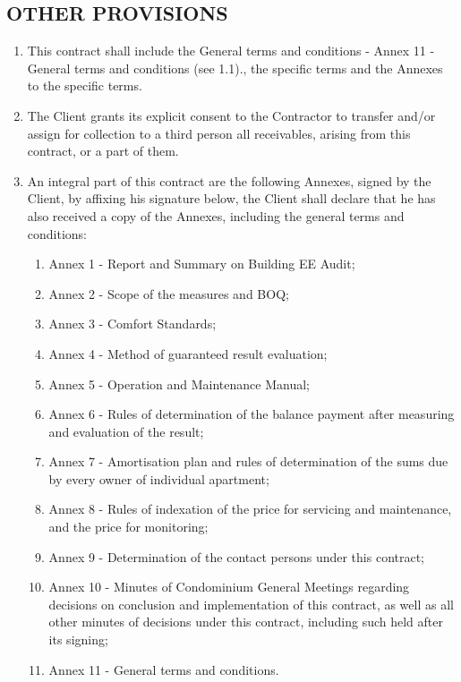 \subsection{OTHER PROVISIONS}
\begin{enumerate}
\item This contract shall include the General terms and conditions {-}
  Annex 11 {-} General terms and conditions (see 1.1)., the specific
  terms and the Annexes to the specific terms.
\item The Client grants its explicit consent to the Contractor to
  transfer and/or assign for collection to a third person all
  receivables, arising from this contract, or a part of them.
\item An integral part of this contract are the following Annexes,
  signed by the Client, by affixing his signature below, the Client
  shall declare that he has also received a copy of the Annexes,
  including the general terms and conditions:
  \begin{enumerate}
  \item Annex 1 {-} Report and Summary on Building EE Audit;
  \item Annex 2 {-} Scope of the measures and BOQ;
  \item Annex 3 {-} Comfort Standards;
  \item Annex 4 {-} Method of guaranteed result evaluation;
  \item Annex 5 {-} Operation and Maintenance Manual;
  \item Annex 6 {-} Rules of determination of the balance payment
    after measuring and evaluation of the result;
  \item Annex 7 {-} Amortisation plan and rules of determination of
    the sums due by every owner of individual apartment;
  \item Annex 8 {-} Rules of indexation of the price for servicing and
    maintenance, and the price for monitoring;
  \item Annex 9 {-} Determination of the contact persons under this
    contract;
  \item Annex 10 {-} Minutes of Condominium General Meetings regarding
    decisions on conclusion and implementation of this contract, as
    well as all other minutes of decisions under this contract,
    including such held after its signing;
  \item Annex 11 {-} General terms and conditions.
  \end{enumerate}
\end{enumerate}

